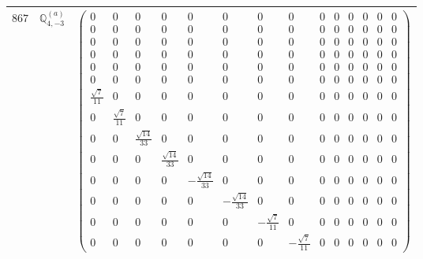 \documentclass[fleqn,8pt,landscape]{jsarticle}
\begin{document}
\begin{center}
\begin{longtable}{ccc}
$ 867 $ & $ \mathbb{Q}_{4,-3}^{(a)} $ & $ \begin{pmatrix} 0 & 0 & 0 & 0 & 0 & 0 & 0 & 0 & 0 & 0 & 0 & 0 & 0 & 0 \\ 0 & 0 & 0 & 0 & 0 & 0 & 0 & 0 & 0 & 0 & 0 & 0 & 0 & 0 \\ 0 & 0 & 0 & 0 & 0 & 0 & 0 & 0 & 0 & 0 & 0 & 0 & 0 & 0 \\ 0 & 0 & 0 & 0 & 0 & 0 & 0 & 0 & 0 & 0 & 0 & 0 & 0 & 0 \\ 0 & 0 & 0 & 0 & 0 & 0 & 0 & 0 & 0 & 0 & 0 & 0 & 0 & 0 \\ 0 & 0 & 0 & 0 & 0 & 0 & 0 & 0 & 0 & 0 & 0 & 0 & 0 & 0 \\ \frac{\sqrt{7}}{11} & 0 & 0 & 0 & 0 & 0 & 0 & 0 & 0 & 0 & 0 & 0 & 0 & 0 \\ 0 & \frac{\sqrt{7}}{11} & 0 & 0 & 0 & 0 & 0 & 0 & 0 & 0 & 0 & 0 & 0 & 0 \\ 0 & 0 & \frac{\sqrt{14}}{33} & 0 & 0 & 0 & 0 & 0 & 0 & 0 & 0 & 0 & 0 & 0 \\ 0 & 0 & 0 & \frac{\sqrt{14}}{33} & 0 & 0 & 0 & 0 & 0 & 0 & 0 & 0 & 0 & 0 \\ 0 & 0 & 0 & 0 & - \frac{\sqrt{14}}{33} & 0 & 0 & 0 & 0 & 0 & 0 & 0 & 0 & 0 \\ 0 & 0 & 0 & 0 & 0 & - \frac{\sqrt{14}}{33} & 0 & 0 & 0 & 0 & 0 & 0 & 0 & 0 \\ 0 & 0 & 0 & 0 & 0 & 0 & - \frac{\sqrt{7}}{11} & 0 & 0 & 0 & 0 & 0 & 0 & 0 \\ 0 & 0 & 0 & 0 & 0 & 0 & 0 & - \frac{\sqrt{7}}{11} & 0 & 0 & 0 & 0 & 0 & 0 \end{pmatrix} $ \\ \hline

\end{longtable}
\end{center}
\end{document}
